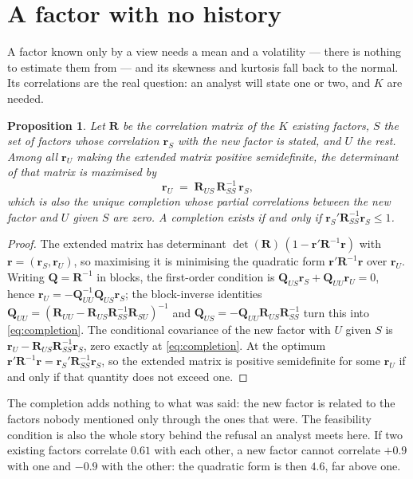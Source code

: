 \documentclass[11pt]{article}
\newtheorem{proposition}{Proposition}
\newcommand{\bR}{\mathbf R}
\newcommand{\br}{\mathbf r}
\begin{document}
\section{A factor with no history}

A factor known only by a view needs a mean and a volatility --- there is nothing
to estimate them from --- and its skewness and kurtosis fall back to the normal.
Its correlations are the real question: an analyst will state one or two, and
$K$ are needed.

\begin{proposition}\label{prop:completion}
Let $\bR$ be the correlation matrix of the $K$ existing factors, $S$ the set of
factors whose correlation $\br_S$ with the new factor is stated, and $U$ the
rest. Among all $\br_U$ making the extended matrix positive semidefinite, the
determinant of that matrix is maximised by
\begin{equation}\label{eq:completion}
  \br_U \;=\; \bR_{US}\, \bR_{SS}^{-1}\, \br_S ,
\end{equation}
which is also the unique completion whose partial correlations between the new
factor and $U$ given $S$ are zero. A completion exists if and only if
$\br_S' \bR_{SS}^{-1} \br_S \le 1$.
\end{proposition}

\begin{proof}
The extended matrix has determinant $\det(\bR)\,(1 - \br'\bR^{-1}\br)$ with
$\br = (\br_S, \br_U)$, so maximising it is minimising the quadratic form
$\br'\bR^{-1}\br$ over $\br_U$. Writing $\mathbf Q = \bR^{-1}$ in blocks, the
first-order condition is $\mathbf Q_{US}\br_S + \mathbf Q_{UU}\br_U = 0$, hence
$\br_U = -\mathbf Q_{UU}^{-1}\mathbf Q_{US}\br_S$; the block-inverse identities
$\mathbf Q_{UU} = (\bR_{UU} - \bR_{US}\bR_{SS}^{-1}\bR_{SU})^{-1}$ and
$\mathbf Q_{US} = -\mathbf Q_{UU}\bR_{US}\bR_{SS}^{-1}$ turn this into
\eqref{eq:completion}. The conditional covariance of the new factor with $U$
given $S$ is $\br_U - \bR_{US}\bR_{SS}^{-1}\br_S$, zero exactly at
\eqref{eq:completion}. At the optimum $\br'\bR^{-1}\br = \br_S'\bR_{SS}^{-1}\br_S$,
so the extended matrix is positive semidefinite for some $\br_U$ if and only if
that quantity does not exceed one.
\end{proof}

The completion adds nothing to what was said: the new factor is related to the
factors nobody mentioned only through the ones that were. The feasibility
condition is also the whole story behind the refusal an analyst meets here. If
two existing factors correlate $0.61$ with each other, a new factor cannot
correlate $+0.9$ with one and $-0.9$ with the other: the quadratic form is then
$4.6$, far above one.
\end{document}
